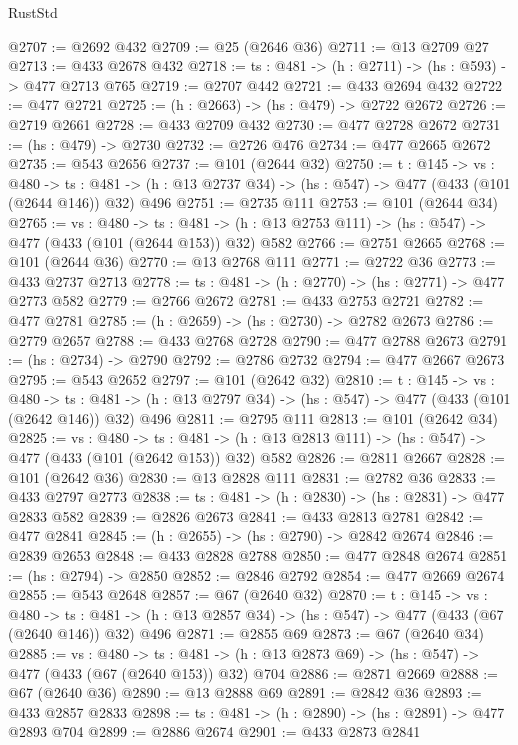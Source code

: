 \begin{lexlean}{RustStd}
\begin{coremodule}
@2707 := @2692 @432
@2709 := @25 (@2646 @36)
@2711 := @13 @2709 @27
@2713 := @433 @2678 @432
@2718 := {ts : @481} -> (h : @2711) -> (hs : @593) -> @477 @2713 @765
@2719 := @2707 @442
@2721 := @433 @2694 @432
@2722 := @477 @2721
@2725 := (h : @2663) -> (hs : @479) -> @2722 @2672
@2726 := @2719 @2661
@2728 := @433 @2709 @432
@2730 := @477 @2728 @2672
@2731 := (hs : @479) -> @2730
@2732 := @2726 @476
@2734 := @477 @2665 @2672
@2735 := @543 @2656
@2737 := @101 (@2644 @32)
@2750 := {t : @145} ->
  {vs : @480} ->
  {ts : @481} -> (h : @13 @2737 @34) -> (hs : @547) -> @477 (@433 (@101 (@2644 @146)) @32) @496
@2751 := @2735 @111
@2753 := @101 (@2644 @34)
@2765 := {vs : @480} ->
  {ts : @481} -> (h : @13 @2753 @111) -> (hs : @547) -> @477 (@433 (@101 (@2644 @153)) @32) @582
@2766 := @2751 @2665
@2768 := @101 (@2644 @36)
@2770 := @13 @2768 @111
@2771 := @2722 @36
@2773 := @433 @2737 @2713
@2778 := {ts : @481} -> (h : @2770) -> (hs : @2771) -> @477 @2773 @582
@2779 := @2766 @2672
@2781 := @433 @2753 @2721
@2782 := @477 @2781
@2785 := (h : @2659) -> (hs : @2730) -> @2782 @2673
@2786 := @2779 @2657
@2788 := @433 @2768 @2728
@2790 := @477 @2788 @2673
@2791 := (hs : @2734) -> @2790
@2792 := @2786 @2732
@2794 := @477 @2667 @2673
@2795 := @543 @2652
@2797 := @101 (@2642 @32)
@2810 := {t : @145} ->
  {vs : @480} ->
  {ts : @481} -> (h : @13 @2797 @34) -> (hs : @547) -> @477 (@433 (@101 (@2642 @146)) @32) @496
@2811 := @2795 @111
@2813 := @101 (@2642 @34)
@2825 := {vs : @480} ->
  {ts : @481} -> (h : @13 @2813 @111) -> (hs : @547) -> @477 (@433 (@101 (@2642 @153)) @32) @582
@2826 := @2811 @2667
@2828 := @101 (@2642 @36)
@2830 := @13 @2828 @111
@2831 := @2782 @36
@2833 := @433 @2797 @2773
@2838 := {ts : @481} -> (h : @2830) -> (hs : @2831) -> @477 @2833 @582
@2839 := @2826 @2673
@2841 := @433 @2813 @2781
@2842 := @477 @2841
@2845 := (h : @2655) -> (hs : @2790) -> @2842 @2674
@2846 := @2839 @2653
@2848 := @433 @2828 @2788
@2850 := @477 @2848 @2674
@2851 := (hs : @2794) -> @2850
@2852 := @2846 @2792
@2854 := @477 @2669 @2674
@2855 := @543 @2648
@2857 := @67 (@2640 @32)
@2870 := {t : @145} ->
  {vs : @480} ->
  {ts : @481} -> (h : @13 @2857 @34) -> (hs : @547) -> @477 (@433 (@67 (@2640 @146)) @32) @496
@2871 := @2855 @69
@2873 := @67 (@2640 @34)
@2885 := {vs : @480} ->
  {ts : @481} -> (h : @13 @2873 @69) -> (hs : @547) -> @477 (@433 (@67 (@2640 @153)) @32) @704
@2886 := @2871 @2669
@2888 := @67 (@2640 @36)
@2890 := @13 @2888 @69
@2891 := @2842 @36
@2893 := @433 @2857 @2833
@2898 := {ts : @481} -> (h : @2890) -> (hs : @2891) -> @477 @2893 @704
@2899 := @2886 @2674
@2901 := @433 @2873 @2841

\end{coremodule}
\end{lexlean}
